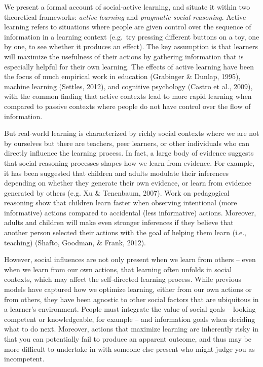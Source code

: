 \documentclass[10pt, letterpaper]{article}
\begin{document}
We present a formal account of social-active learning, and situate it
within two theoretical frameworks: \emph{active learning} and
\emph{pragmatic social reasoning}. Active learning refers to situations
where people are given control over the sequence of information in a
learning context (e.g.~try pressing different buttons on a toy, one by
one, to see whether it produces an effect). The key assumption is that
learners will maximize the usefulness of their actions by gathering
information that is especially helpful for their own learning. The
effects of active learning have been the focus of much empirical work in
education (Grabinger \& Dunlap, 1995), machine learning (Settles, 2012),
and cognitive psychology (Castro et al., 2009), with the common finding
that active contexts lead to more rapid learning when compared to
passive contexts where people do not have control over the flow of
information.

But real-world learning is characterized by richly social contexts where
we are not by ourselves but there are teachers, peer learners, or other
individuals who can directly influence the learning process. In fact, a
large body of evidence suggests that social reasoning processes shapes
how we learn from evidence. For example, it has been suggested that
children and adults modulate their inferences depending on whether they
generate their own evidence, or learn from evidence generated by others
(e.g. Xu \& Tenenbaum, 2007). Work on pedagogical reasoning show that
children learn faster when observing intentional (more informative)
actions compared to accidental (less informative) actions. Moreover,
adults and children will make even stronger inferences if they believe
that another person selected their actions with the goal of helping them
learn (i.e., teaching) (Shafto, Goodman, \& Frank, 2012).

However, social influences are not only present when we learn from
others -- even when we learn from our own actions, that learning often
unfolds in social contexts, which may affect the self-directed learning
process. While previous models have captured how we optimize learning,
either from our own actions or from others, they have been agnostic to
other social factors that are ubiquitous in a learner's environment.
People must integrate the value of social goals -- looking competent or
knowledgeable, for example -- and information goals when deciding what
to do next. Moreover, actions that maximize learning are inherently
risky in that you can potentially fail to produce an apparent outcome,
and thus may be more difficult to undertake in with someone else present
who might judge you as incompetent.
\end{document}
